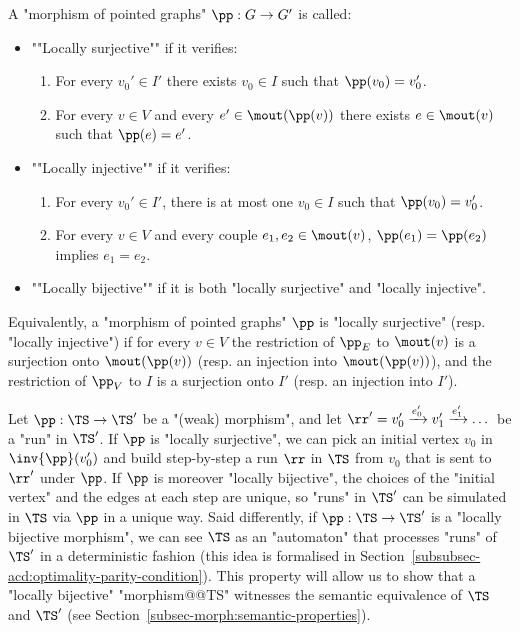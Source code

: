 \documentclass[10pt,a4paper]{amsart}
\newcommand{\re}[1]{\xrightarrow{#1}}
\begin{document}
\begin{definition}\label{def:loc_bijective_morphisms}
	A "morphism of pointed graphs" $\pp: G \rightarrow G'$ is called:	
	\begin{itemize}
		\item  \AP""Locally surjective"" if it verifies: 
		\begin{enumerate}
			\item For every $v_0'\in I'$ there exists $v_0\in I$ such that $\pp(v_0)=v_0'$.
			\item 
			For every $v\in V$ and every $ e'\in \mout(\pp(v))$
			there exists $e\in \mout(v) $ such that $ \pp(e)=e' $. 
		\end{enumerate}
		
		\item \AP""Locally injective"" if it verifies:
		\begin{enumerate}
			\item For every $v_0'\in I'$, there is at most one $v_0\in I$ such that $\pp(v_0)=v_0'$. 
			
			\item For every $ v\in V$ and every couple $ e_1,e_2\in \mout(v) $,  $\pp(e_1)=\pp(e_2)$ implies $e_1=e_2$.
		\end{enumerate}
		\item \AP""Locally bijective"" if it is both "locally surjective" and "locally injective".
	\end{itemize}
\end{definition}

Equivalently, a "morphism of pointed graphs" $\pp$ is "locally surjective" (resp. "locally injective") if for every $v\in V$ the restriction of $\pp_E$ to $\mout(v)$ is a surjection onto $\mout(\pp(v))$ (resp. an injection into $\mout(\pp(v))$), and the restriction of $\pp_V$ to $I$ is a surjection onto $I'$ (resp. an injection into $I'$).

Let $\pp: \TS \rightarrow \TS'$ be a  "(weak) morphism", and let $\rr'= v_0'\re{e_0'}v_1'\re{e_1'}\dots$ be a "run" in $\TS'$. If $\pp$ is "locally surjective", we can pick an initial vertex $v_0$ in $\inv{\pp}(v_0')$ and build step-by-step a run $\rr$ in $\TS$ from $v_0$ that is sent to $\rr'$ under $\pp$. If $\pp$ is moreover "locally bijective", the choices of the "initial vertex" and the edges at each step are unique, so "runs" in $\TS'$ can be simulated in $\TS$ via $\pp$ in a unique way.
Said differently, if $\pp: \TS \rightarrow \TS'$ is a  "locally bijective morphism", we can see $\TS$ as an "automaton" that processes "runs" of $\TS'$ in a deterministic fashion (this idea is formalised in Section~\ref{subsubsec-acd:optimality-parity-condition}).
This property will allow us to show that a "locally bijective" "morphism@@TS" witnesses the semantic equivalence of $\TS$ and $\TS'$ (see Section~\ref{subsec-morph:semantic-properties}).
\end{document}
